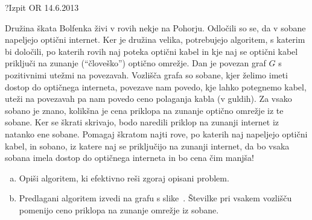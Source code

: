 \begin{naloga}{?}{Izpit OR 14.6.2013}
\begin{vprasanje}[optika]
Družina škata Bolfenka živi v rovih nekje na Pohorju.
Odločili so se, da v sobane napeljejo optični internet.
Ker je družina velika, potrebujejo algoritem, s katerim bi določili,
po katerih rovih naj poteka optični kabel
in kje naj se optični kabel priključi
na zunanje (``človeško'') optično omrežje.
Dan je povezan graf $G$ s pozitivnimi utežmi na povezavah.
Vozlišča grafa so sobane, kjer želimo imeti dostop do optičnega interneta,
povezave nam povedo, kje lahko potegnemo kabel,
uteži na povezavah pa nam povedo ceno polaganja kabla (v guldih).
Za vsako sobano je znano,
kolikšna je cena priklopa na zunanje optično omrežje iz te sobane.
Ker se škrati skrivajo,
bodo naredili priklop na zunanji internet iz natanko ene sobane.
Pomagaj škratom najti rove, po katerih naj napeljejo optični kabel,
in sobano, iz katere naj se priključijo na zunanji internet,
da bo vsaka sobana imela dostop do optičnega interneta in bo cena čim manjša!

\begin{enumerate}[(a)]
\item Opiši algoritem, ki efektivno reši zgoraj opisani problem.

\item Predlagani algoritem izvedi na grafu s slike~\fig{}.
Številke pri vsakem vozlišču
pomenijo ceno priklopa na zunanje omrežje iz sobane.
\end{enumerate}

\begin{slika}
\pgfslika
{}
\end{slika}
\end{vprasanje}
\begin{odgovor}
\end{odgovor}
\end{naloga}


